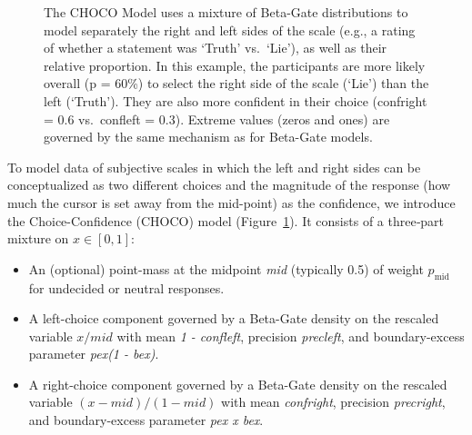 \documentclass[
  jou,
  floatsintext,
  longtable,
  nolmodern,
  notxfonts,
  notimes,
  colorlinks=true,linkcolor=blue,citecolor=blue,urlcolor=blue]{apa7}
\providecommand{\tightlist}{%
  \setlength{\itemsep}{0pt}\setlength{\parskip}{0pt}}
\begin{document}
\begin{figure}

\caption{\label{fig-two}The CHOCO Model uses a mixture of Beta-Gate
distributions to model separately the right and left sides of the scale
(e.g., a rating of whether a statement was `Truth' vs.~`Lie'), as well
as their relative proportion. In this example, the participants are more
likely overall (p = 60\%) to select the right side of the scale (`Lie')
than the left (`Truth'). They are also more confident in their choice
(confright = 0.6 vs.~confleft = 0.3). Extreme values (zeros and ones)
are governed by the same mechanism as for Beta-Gate models.}


\end{figure}%

To model data of subjective scales in which the left and right sides can
be conceptualized as two different choices and the magnitude of the
response (how much the cursor is set away from the mid-point) as the
confidence, we introduce the Choice-Confidence (CHOCO) model
(Figure~\ref{fig-two}). It consists of a three‐part mixture on
\(x \in [0, 1]\):

\begin{itemize}
\tightlist
\item
  An (optional) point-mass at the midpoint \emph{mid} (typically 0.5) of
  weight \(p_{\text{mid}}\) for undecided or neutral responses.\\
\item
  A left-choice component governed by a Beta-Gate density on the
  rescaled variable \(x/mid\) with mean \emph{1 - confleft}, precision
  \emph{precleft}, and boundary-excess parameter \emph{pex(1 - bex)}.\\
\item
  A right-choice component governed by a Beta-Gate density on the
  rescaled variable \((x - mid)/(1 - mid)\) with mean \emph{confright},
  precision \emph{precright}, and boundary-excess parameter \emph{pex x
  bex}.
\end{itemize}
\end{document}
